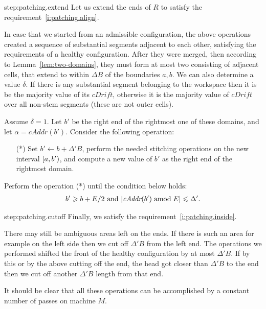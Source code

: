 \documentclass[12pt]{memoir}
\newcommand{\fld}[1]{\ensuremath{\textit{#1}}}
\def\B{B}
\newcommand{\E}{E}
\newcommand{\R}{R}
\newcommand{\cAddr}{\fld{cAddr}}
\newcommand{\cDrift}{\fld{cDrift}}
\begin{document}
\begin{Proof}
\begin{step+}{step:patching.extend}
  Let us extend the ends of \( \R \) to satisfy the requirement~\eqref{i:patching.align}.
\end{step+}
\begin{prooofi}
In case that we started from an admissible configuration, the above operations
created a sequence of substantial segments adjacent to each other, satisfying the 
requirements of a healthy configuration.
After they were merged, then according to Lemma~\ref{lem:two-domains},
they must form at most two  consisting of adjacent cells, that extend
to within \( \Delta\B \) of the boundaries \( a,b \).
We can also determine a value \( \delta \).
If there is any substantial segment belonging to the workspace
 then it is be the majority value of its \( \cDrift \), otherwise it is 
the majority value of \( \cDrift \) over all non-stem segments (these are not outer cells).

Assume \( \delta=1 \).
Let \( b' \) be the right end of the rightmost one of these domains,
and let \( \alpha=\cAddr(b') \).
Consider the following operation:
 \begin{itemize}
\item[(*)] 
Set \(  b'\gets b+\Delta'\B \), perform the needed stitching operations on the 
new interval \( [a,b') \), and 
compute a new value of \( b' \) as the right end of the rightmost domain.
 \end{itemize}
Perform the operation (*) until the condition below holds:
 \begin{align}\label{eq:patching.terminate}
   b'\ge b+\E/2 \text{ and }    |\cAddr(b') \amod \E| \le \Delta'.
 \end{align}
\end{prooofi} %

\begin{step+}{step:patching.cutoff}
Finally, we satisfy the requirement~\eqref{i:patching.inside}.
\end{step+}
\begin{prooofi}
There may still be ambiguous areas left on the ends.
If there is such an area for example on the left side then we cut off \( \Delta'\B \) 
from the left end.
The operations we performed shifted the front of the healthy configuration by at most
\( \Delta'\B \).
If by this or by the above cutting off the end, the head got closer than \( \Delta'\B \) to the
end then we cut off another \( \Delta'\B \) length from that end.
\end{prooofi} %

It should be clear that all these operations can be accomplished by a constant number of
passes on machine \( M \).
\end{Proof}
\end{document}
